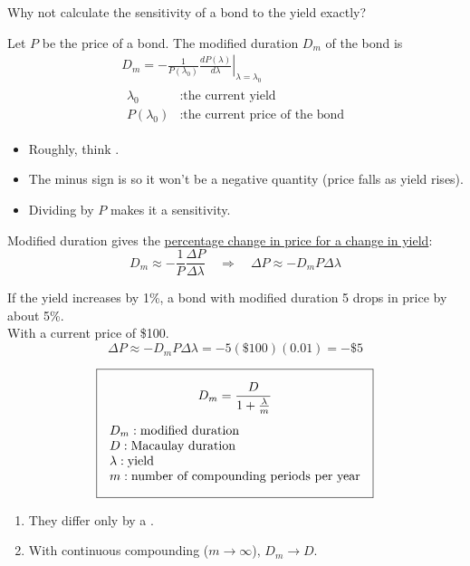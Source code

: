 Why not calculate the sensitivity of a bond to the yield exactly?
\begin{definition}
    Let $P$ be the price of a bond. The modified duration $D_m$ of the bond is
    \[\boxed{\begin{gathered}
        D_m = -\frac{1}{P(\lambda_0)}\left.\frac{dP(\lambda)}{d\lambda}\right|_{\lambda = \lambda_0}\\[4pt]
        \begin{aligned}
            \lambda_0 &: \text{the current yield}\\
            P(\lambda_0) &: \text{the current price of the bond}
        \end{aligned}
    \end{gathered}}\]
\end{definition}
\begin{itemize}
    \item Roughly, think .
    \item The minus sign is so it won't be a negative quantity (price falls as yield rises).
    \item Dividing by $P$ makes it a  sensitivity.
\end{itemize}

Modified duration gives the \ul{percentage change in price for a change in yield}:
\[D_m \approx -\frac{1}{P}\frac{\Delta P}{\Delta\lambda} \quad \Rightarrow \quad \boxed{\Delta P \approx -D_m P \Delta\lambda}\]

\begin{example}
    If the yield increases by 1\%, a bond with modified duration 5 drops in price by about 5\%.
    \\With a current price of \$100.
    \[\Delta P \approx -D_m P\Delta\lambda = -5(\$100)(0.01) = -\$5\]
\end{example}

\[\boxed{\begin{gathered}
    D_m = \frac{D}{1+\frac{\lambda}{m}}\\[4pt]
    \begin{array}{@{}l@{}}
        D_m: \text{modified duration}\\
        D: \text{Macaulay duration}\\
        \lambda: \text{yield}\\
        m: \text{number of compounding periods per year}
    \end{array}
\end{gathered}}\]
\begin{enumerate}[label=(\roman*)]
    \item They differ only by a .
    \item With continuous compounding ($m\to\infty$), $D_m \to D$.
\end{enumerate}

